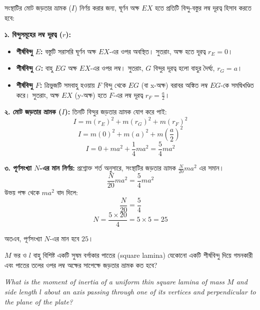 \documentclass[12pt, a4paper]{article}
\begin{document}
\begin{tcolorbox}[solutionbox={সমাধান (Solution)}]
\noindent
সংস্থাটির মোট জড়তার ভ্রামক ($I$) নির্ণয় করার জন্য, ঘূর্ণন অক্ষ $EX$ হতে প্রতিটি বিন্দু-বস্তুর লম্ব দূরত্ব হিসাব করতে হবে:

\vspace{0.5em}
\textbf{১. বিন্দুসমূহের লম্ব দূরত্ব ($r$):}
\begin{itemize}[leftmargin=1.5em, itemsep=0.2em]
    \item \textbf{শীর্ষবিন্দু $E$:} বস্তুটি সরাসরি ঘূর্ণন অক্ষ $EX$-এর ওপর অবস্থিত। 
    সুতরাং, অক্ষ হতে দূরত্ব $r_E = 0$।
    
    \item \textbf{শীর্ষবিন্দু $G$:} বাহু $EG$ অক্ষ $EX$-এর ওপর লম্ব। 
    সুতরাং, $G$ বিন্দুর দূরত্ব হলো বাহুর দৈর্ঘ্য, $r_G = a$।
    
    \item \textbf{শীর্ষবিন্দু $F$:} ত্রিভুজটি সমবাহু হওয়ায় $F$ বিন্দু থেকে $EG$ (বা x-অক্ষ) বরাবর অঙ্কিত লম্ব $EG$-কে সমদ্বিখণ্ডিত করে। 
    সুতরাং, অক্ষ $EX$ (y-অক্ষ) হতে $F$-এর লম্ব দূরত্ব $r_F = \frac{a}{2}$।
\end{itemize}

\vspace{0.5em}
\textbf{২. মোট জড়তার ভ্রামক ($I$):}
তিনটি বিন্দুর জড়তার ভ্রামক যোগ করে পাই:
$$I = m (r_E)^2 + m (r_G)^2 + m (r_F)^2$$
$$I = m (0)^2 + m (a)^2 + m \left(\frac{a}{2}\right)^2$$
$$I = 0 + m a^2 + \frac{1}{4} m a^2 = \frac{5}{4} m a^2$$

\vspace{0.5em}
\textbf{৩. পূর্ণসংখ্যা $N$-এর মান নির্ণয়:}
প্রশ্নোক্ত শর্ত অনুসারে, সংস্থাটির জড়তার ভ্রামক $\frac{N}{20} m a^2$ এর সমান। 
$$\frac{N}{20} m a^2 = \frac{5}{4} m a^2$$
উভয় পক্ষ থেকে $m a^2$ বাদ দিলে:
$$\frac{N}{20} = \frac{5}{4}$$
$$N = \frac{5 \times 20}{4} = 5 \times 5 = 25$$

অতএব, পূর্ণসংখ্যা $N$-এর মান হবে $25$।
\end{tcolorbox}
\vspace{1em}
\begin{tcolorbox}[questionbox={প্রশ্ন (Question) 46}]
\noindent
$M$ ভর ও $l$ বাহু বিশিষ্ট একটি সুষম বর্গাকার পাতের (square lamina) যেকোনো একটি শীর্ষবিন্দু দিয়ে গমনকারী এবং পাতের তলের ওপর লম্ব অক্ষের সাপেক্ষে জড়তার ভ্রামক কত হবে?

\vspace{0.8em}
\begin{english}
\noindent\textit{\color{darkgray}
What is the moment of inertia of a uniform thin square lamina of mass $M$ and side length $l$ about an axis passing through one of its vertices and perpendicular to the plane of the plate?
}
\end{english}
\end{tcolorbox}
\end{document}
